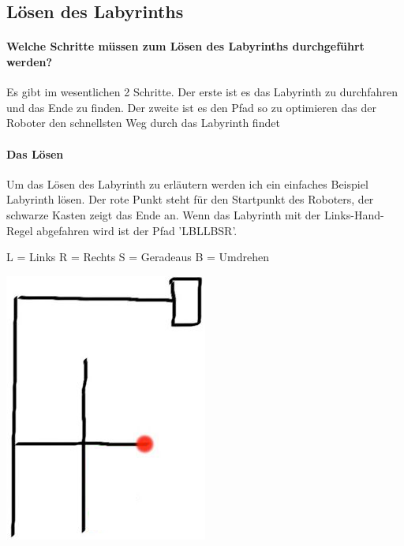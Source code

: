 \documentclass[12pt]{article}
\begin{document}
\subsection{Lösen des Labyrinths}
\paragraph{Welche Schritte müssen zum Lösen des Labyrinths durchgeführt werden?} 
Es gibt im wesentlichen 2 Schritte. Der erste ist es das Labyrinth zu durchfahren und das Ende zu finden. Der zweite ist es den Pfad so zu optimieren das der Roboter den schnellsten Weg durch das Labyrinth findet

\paragraph{Das Lösen}
Um das Lösen des Labyrinth zu erläutern werden ich  ein einfaches Beispiel Labyrinth lösen. Der rote Punkt steht für den Startpunkt des Roboters, der schwarze Kasten zeigt das Ende an. Wenn das Labyrinth mit der Links-Hand-Regel abgefahren wird ist der Pfad 'LBLLBSR'.
\par
L = Links
R = Rechts
S = Geradeaus
B = Umdrehen

\includegraphics[width=0.8 \textwidth]{images/example_maze.png}
\end{document}
